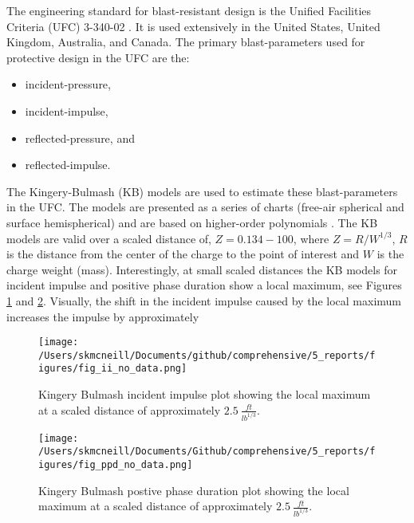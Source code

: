 The engineering standard for blast-resistant design is the Unified Facilities Criteria (UFC) 3-340-02 \cite{UFC3-340-02-2008}.  It is used extensively in the United States, United Kingdom, Australia, and Canada.   The primary blast-parameters used for protective design in the UFC are the:
\begin{itemize}
  \item incident-pressure,
  \item incident-impulse,
  \item reflected-pressure, and
  \item reflected-impulse.
\end{itemize}

The Kingery-Bulmash (KB) models are used to estimate these blast-parameters in the UFC.  The models are presented as a series of charts (free-air spherical and surface hemispherical) and are based on higher-order polynomials \cite{Kingery1984}.  The KB models are valid over a scaled distance of, $Z = 0.134 - 100$, where $Z=R/W^{1/3}$, $R$ is the distance from the center of the charge to the point of interest and $W$ is the charge weight (mass). Interestingly, at small scaled distances the KB models for incident impulse and positive phase duration show a local maximum, see Figures \ref{fig:KB_incident_impulse} and \ref{fig:KB_ppd}.  Visually, the shift in the incident impulse caused by the local maximum increases the impulse by approximately 

\begin{figure}[tb]
  \begin{center}
   \texttt{[image: /Users/skmcneill/Documents/github/comprehensive/5\_reports/figures/fig\_ii\_no\_data.png]}
  \end{center}
  \caption{Kingery Bulmash incident impulse plot showing the local maximum at a scaled distance of approximately $2.5\:\frac{ft}{lb^{1/3}}$\citep{Kingery1984}.}
\label{fig:KB_incident_impulse}
\end{figure}%
   
\begin{figure}[tb]
  \begin{center}
   \texttt{[image: /Users/skmcneill/Documents/Github/comprehensive/5\_reports/figures/fig\_ppd\_no\_data.png]}
  \end{center}
  \caption{Kingery Bulmash postive phase duration plot showing the local maximum at a scaled distance of approximately $2.5\:\frac{ft}{lb^{1/3}}$\citep{Kingery1984}.}
\label{fig:KB_ppd}
\end{figure}%


